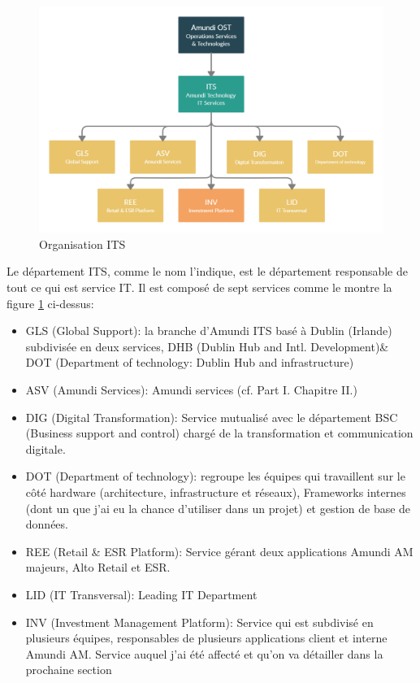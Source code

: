 \begin{figure}[ht]
    \centering
    \includegraphics[width=\columnwidth]{img/Org ITS.png}
    \caption{Organisation ITS}
    \label{fig:its}
\end{figure}

\par Le département ITS, comme le nom l'indique, est le département responsable de tout ce qui est service IT. Il est composé de sept services comme le montre la figure \ref{fig:its} ci-dessus: 
\begin{itemize}
    \item GLS (Global Support): la branche d'Amundi ITS basé à Dublin (Irlande) subdivisée en deux services, DHB (Dublin Hub and Intl. Development)\& DOT (Department of technology: Dublin Hub and infrastructure)
    \item ASV (Amundi Services): Amundi services (cf. Part I. Chapitre II.)
    \item DIG (Digital Transformation): Service mutualisé avec le département BSC (Business support and control) chargé de la transformation et communication digitale.
    \item DOT (Department of technology): regroupe les équipes qui travaillent sur le côté hardware (architecture, infrastructure et réseaux), Frameworks internes (dont un que j'ai eu la chance d'utiliser dans un projet) et gestion de base de données. 
    \item REE (Retail \& ESR Platform): Service gérant deux applications Amundi AM majeurs, Alto Retail et ESR. 
    \item LID (IT Transversal): Leading IT Department
    \item INV (Investment Management Platform): Service qui est subdivisé en plusieurs équipes, responsables de plusieurs applications client et interne Amundi AM. Service auquel j'ai été affecté et qu'on va détailler dans la prochaine section
\end{itemize}

